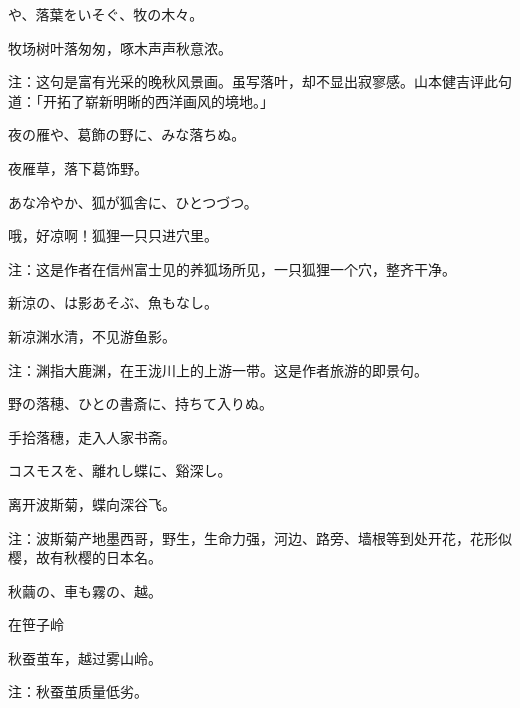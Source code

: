\begin{haiku}
    {\FH {}や、落葉をいそぐ、牧の木々。}

    {\FK 牧场树叶落匆匆，啄木声声秋意浓。}

    {\FT 注：这句是富有光采的晚秋风景画。虽写落叶，却不显出寂寥感。山本健吉评此句道：「开拓了崭新明晰的西洋画风的境地。」}
\end{haiku}

\begin{haiku}
    {\FH 夜の雁や、葛飾の野に、みな落ちぬ。}

    {\FK 夜雁草，落下葛饰野。}
\end{haiku}

\begin{haiku}
    {\FH あな冷やか、狐が狐舎に、ひとつづつ。}

    {\FK 哦，好凉啊！狐狸一只只进穴里。}

    {\FT 注：这是作者在信州富士见的养狐场所见，一只狐狸一个穴，整齐干净。}
\end{haiku}

\begin{haiku}
    {\FH 新涼の、は影あそぶ、魚もなし。}

    {\FK 新凉渊水清，不见游鱼影。}

    {\FT 注：渊指大鹿渊，在王泷川上的上游一带。这是作者旅游的即景句。}
\end{haiku}

\begin{haiku}
    {\FH 野の落穂、ひとの書斎に、持ちて入りぬ。}

    {\FK 手拾落穗，走入人家书斋。}
\end{haiku}

\begin{haiku}
    {\FH コスモスを、離れし蝶に、谿深し。}

    {\FK 离开波斯菊，蝶向深谷飞。}

    {\FT 注：波斯菊产地墨西哥，野生，生命力强，河边、路旁、墙根等到处开花，花形似樱，故有秋樱的日本名。}
\end{haiku}

\begin{haiku}
    {\FH 秋繭の、車も霧の、越。}

    {\FK 在笹子岭}

    {\FK 秋蚕茧车，越过雾山岭。}

    {\FT 注：秋蚕茧质量低劣。}
\end{haiku}


